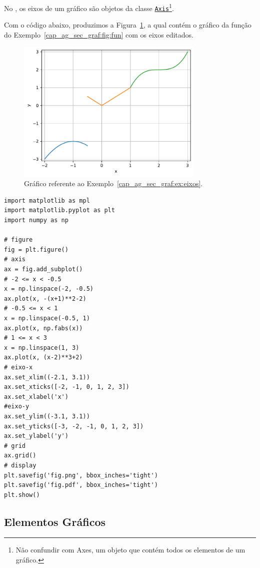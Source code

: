 No {\matplotlib}, os eixos de um gráfico são objetos da classe \href{https://matplotlib.org/stable/api/axis_api.html#matplotlib.axis.Axis}{\lstinline+Axis+}\footnote{Não confundir com Axes, um objeto que contém todos os elementos de um gráfico.}.

\begin{ex}\label{cap_ag_sec_graf:ex:axis}
  Com o código abaixo, produzimos a Figura~\ref{cap_ag_sec_graf:fig:eixos}, a qual contém o gráfico da função do Exemplo~\ref{cap_ag_sec_graf:fig:fun} com os eixos editados.

  \begin{figure}[H]
    \centering
    \includegraphics[width=0.8\textwidth]{./cap_ag/dados/fig_eixos/fig}
    \caption{Gráfico referente ao Exemplo~\ref{cap_ag_sec_graf:ex:eixos}.}
    \label{cap_ag_sec_graf:fig:eixos}
  \end{figure}  

\begin{lstlisting}
import matplotlib as mpl
import matplotlib.pyplot as plt
import numpy as np

# figure
fig = plt.figure()
# axis
ax = fig.add_subplot()
# -2 <= x < -0.5
x = np.linspace(-2, -0.5)
ax.plot(x, -(x+1)**2-2)
# -0.5 <= x < 1
x = np.linspace(-0.5, 1)
ax.plot(x, np.fabs(x))
# 1 <= x < 3
x = np.linspace(1, 3)
ax.plot(x, (x-2)**3+2)
# eixo-x
ax.set_xlim((-2.1, 3.1))
ax.set_xticks([-2, -1, 0, 1, 2, 3])
ax.set_xlabel('x')
#eixo-y
ax.set_ylim((-3.1, 3.1))
ax.set_yticks([-3, -2, -1, 0, 1, 2, 3])
ax.set_ylabel('y')
# grid
ax.grid()
# display
plt.savefig('fig.png', bbox_inches='tight')
plt.savefig('fig.pdf', bbox_inches='tight')
plt.show()
\end{lstlisting}
\end{ex}

\subsection{Elementos Gráficos}

